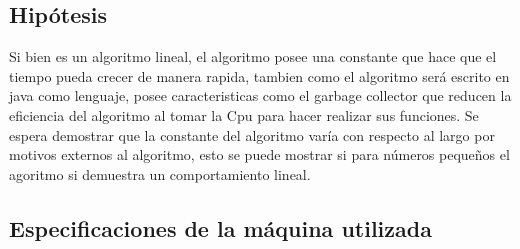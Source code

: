 \documentclass[letterpaper,10pt]{article}
\begin{document}
	\subsection{Hipótesis}
	
	Si bien es un algoritmo lineal, el algoritmo posee una constante que hace que el tiempo pueda crecer de manera rapida, tambien como el algoritmo será escrito en java como lenguaje, posee caracteristicas como el garbage collector que reducen la eficiencia del algoritmo al tomar la Cpu para hacer realizar sus funciones. Se espera demostrar que la constante del algoritmo varía con respecto al largo por motivos externos al algoritmo, esto se puede mostrar si para números pequeños el agoritmo si demuestra un comportamiento lineal.
	
	\subsection*{Especificaciones de la máquina utilizada}

	\newpage
\end{document}
